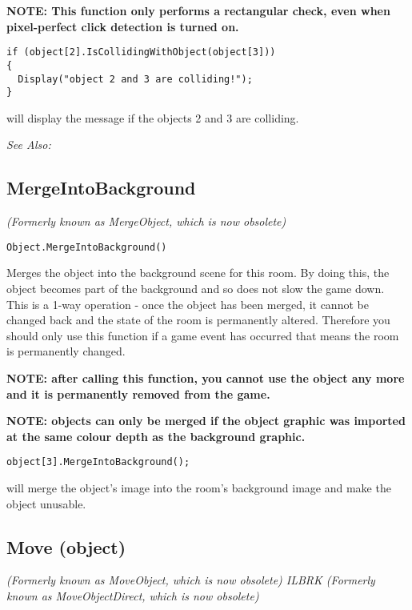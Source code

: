 \bf{NOTE:} This function only performs a rectangular check, even when pixel-perfect
click detection is turned on.

\begin{verbatim}
if (object[2].IsCollidingWithObject(object[3]))
{
  Display("object 2 and 3 are colliding!");
}
\end{verbatim}
will display the message if the objects 2 and 3 are colliding.

\it{See Also:} 


\subsection{MergeIntoBackground}\label{Object.MergeIntoBackground}%

\it{(Formerly known as MergeObject, which is now obsolete)}

\begin{verbatim}
Object.MergeIntoBackground()
\end{verbatim}
Merges the object into the background scene for this room.
By doing this, the object becomes part of the background and so does not
slow the game down. This is a 1-way operation - once the object has
been merged, it cannot be changed back and the state of the room is
permanently altered. Therefore you should only use this function if a game
event has occurred that means the room is permanently changed.

\bf{NOTE:} after calling this function, you cannot use the object any more and
it is permanently removed from the game.

\bf{NOTE:} objects can only be merged if the object graphic was imported at
the same colour depth as the background graphic.

\begin{verbatim}
object[3].MergeIntoBackground();
\end{verbatim}
will merge the object's image into the room's background image and make the object unusable.


\subsection{Move (object)}\label{Object.Move}%

\it{(Formerly known as MoveObject, which is now obsolete)} ILBRK
\it{(Formerly known as MoveObjectDirect, which is now obsolete)}

